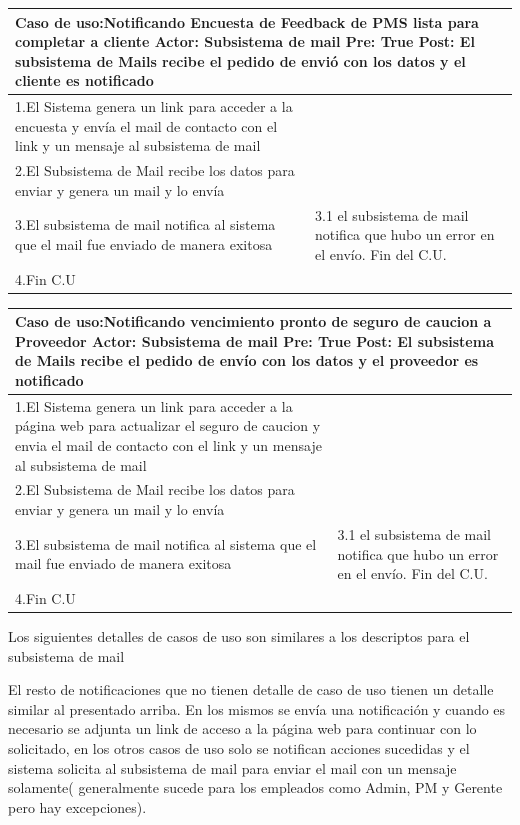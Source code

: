 \begin{longtable}{|p{}|p{}|}
    \hline
    \multicolumn{2}{|p{16cm}|}{
        \textbf{Caso de uso:}Notificando Encuesta de Feedback de PMS lista para completar a cliente\newline
        \textbf{Actor:} Subsistema de mail\newline
        \textbf{Pre: }True\newline
        \textbf{Post:}  El subsistema de Mails recibe el pedido de envió con los datos y el cliente es notificado
    }\\
    \hline
    1.El Sistema genera un link para acceder a la encuesta y envía el mail de contacto con el link y un mensaje al subsistema de mail&    \\
    \hline
    2.El Subsistema de Mail recibe los datos para enviar y genera un mail y lo envía& \\
    \hline
    3.El subsistema de mail notifica al sistema que el mail fue enviado de manera exitosa& 3.1 el subsistema de mail notifica que hubo un error en el envío. Fin del C.U.\\
    \hline
    4.Fin C.U&\\
    \hline
\end{longtable}

\begin{longtable}{|p{}|p{}|}
    \hline
    \multicolumn{2}{|p{16cm}|}{
        \textbf{Caso de uso:}Notificando vencimiento pronto de seguro de caucion a Proveedor\newline
        \textbf{Actor:} Subsistema de mail\newline
        \textbf{Pre: }True\newline
        \textbf{Post:}  El subsistema de Mails recibe el pedido de envío con los datos y el proveedor es notificado
    }\\
    \hline
    1.El Sistema genera un link para acceder a la página web para actualizar el seguro de caucion y envia el mail de contacto con el link y un mensaje al subsistema de mail&    \\
    \hline
    2.El Subsistema de Mail recibe los datos para enviar y genera un mail y lo envía& \\
    \hline
    3.El subsistema de mail notifica al sistema que el mail fue enviado de manera exitosa& 3.1 el subsistema de mail notifica que hubo un error en el envío. Fin del C.U.\\
    \hline
    4.Fin C.U&\\
    \hline
\end{longtable}
Los siguientes detalles de casos de uso son similares a los descriptos para el subsistema de mail

El resto de notificaciones que no tienen detalle de caso de uso tienen un detalle similar al presentado arriba. En los mismos se envía una notificación y cuando es necesario se adjunta un link de acceso a la página web para continuar con lo solicitado, en los otros casos de uso solo se notifican acciones sucedidas y el sistema solicita al subsistema de mail para enviar el mail con un mensaje solamente( generalmente sucede para los empleados como Admin, PM y Gerente pero hay excepciones).